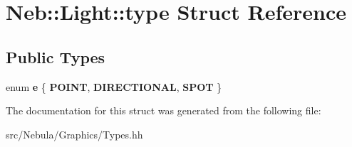 \hypertarget{structNeb_1_1Light_1_1type}{\section{Neb\-:\-:Light\-:\-:type Struct Reference}
\label{structNeb_1_1Light_1_1type}
}
\subsection*{Public Types}
\begin{DoxyCompactItemize}
\item 
enum {\bfseries e} \{ {\bfseries P\-O\-I\-N\-T}, 
{\bfseries D\-I\-R\-E\-C\-T\-I\-O\-N\-A\-L}, 
{\bfseries S\-P\-O\-T}
 \}
\end{DoxyCompactItemize}


The documentation for this struct was generated from the following file\-:\begin{DoxyCompactItemize}
\item 
src/\-Nebula/\-Graphics/Types.\-hh\end{DoxyCompactItemize}
